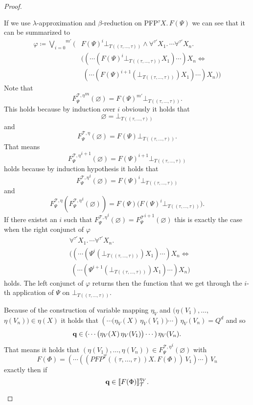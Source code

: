 \begin{proof}
\begin{compactitem}
         If we use $\lambda$-approximation and $\beta$-reduction on PFP$^\tau X.\,F(\Psi)$ we can 
         see that it can be summarized to
         \begin{align*}
         \varphi \coloneqq \overset{m'}{\underset{i= 0}{\bigvee}} \Big(&F(\Psi)^i \bot_{T((\tau, \dots, \tau))} \wedge \forall^{\tau'} X_1.\, \dotsb \forall^{\tau'} X_n.\,\\& 
         \big((\dotsb(F(\Psi)^i \bot_{T((\tau, \dots, \tau))} X_1)\dotsb)X_n \Leftrightarrow \\&\;(\dotsb(F(\Psi)^{i+1}(\bot_{T((\tau, \dots, \tau))}) X_1)\dotsb)X_n\big)\Big)
         \end{align*}
		Note that 
		\[{F_\Psi^{\mathcal{T},\eta}}^m(\varnothing) = F(\Psi)^{m'} \bot_{T((\tau, \dots, \tau))}.\] 
		This holds because by induction over $i$ obviously it holds that
		\[\varnothing = \bot_{T((\tau, \dots, \tau))}\] 
		and 
		\[F_\Psi^{\mathcal{T},\eta}(\varnothing) = F(\Psi)\bot_{T((\tau, \dots, \tau))}.\] 
		That means 
		\[{F_\Psi^{\mathcal{T},\eta}}^{i+1}(\varnothing) = F(\Psi)^{i+1}\bot_{T((\tau, \dots, \tau))}\] 
		holds because by induction hypothesis it holds that
		\[{F_\Psi^{\mathcal{T},\eta}}^{i}
		(\varnothing) = F(\Psi)^{i}\bot_{T((\tau, \dots, \tau))}\] 
		and 
		\[F_\Psi^{\mathcal{T},\eta}({F_\Psi^{\mathcal{T},\eta}}^{i}(\varnothing))= F(\Psi)\big(F(\Psi)^{i}\bot_{T((\tau, \dots, \tau))})\big.\]
		If there existst an $i$ such that ${F_\Psi^{\mathcal{T},\eta}}^i(\varnothing) = {F_\Psi^		
        \mathcal{T}}^{i+1}(\varnothing)$ this is exactly the case when the right conjunct of $\varphi$
		\begin{align*}
		&\forall^{\tau'} X_1.\, \dotsb \forall^{\tau'} X_n.\,\\& 
         \big((\dotsb(\Psi^i(\bot_{T((\tau, \dots, \tau))}) X_1)\dotsb)X_n \Leftrightarrow \\&\;(\dotsb(\Psi^{i+1}(\bot_{T((\tau, \dots, \tau))}) X_1)\dotsb)X_n\big)
         \end{align*}
		holds. The left conjunct of $\varphi$ returns then the function that we get through  
		the $i$-th application of $\Psi$ on $\bot_{T((\tau, \dots, \tau))}$.
		
		Because of the construction of variable mapping $\eta_V$ and $(\eta(V_1), \dots, $ $\eta(V_n)) 
		\in \eta(X)$ it holds that $(\dotsb\big(\eta_V(X)\,\eta_V(V_1)\big) \dotsb )\,\eta_V(V_n) = Q^d$
        and so 
         \[\emph{q} \in (\dotsb\big(\eta_V(X)\,\eta_V(V_1)\big) \dotsb )\,\eta_V(V_n).\]
         That means it holds that $(\eta(V_1), \dots, \eta(V_n)) \in {F_\Psi^{\mathcal{T},\eta}}^i(\varnothing)$ with 
        \[F(\Phi) = (\dotsb((PFP^T((\tau, \dots, \tau)) X.\, F(\Phi))\, V_1)\dotsb )\, V_n \]
        exactly then if \[\emph{q} \in \llbracket F(\Phi) \rrbracket_\mathcal{T}^{\eta_V}.\]
        

\end{compactitem}
\end{proof}
